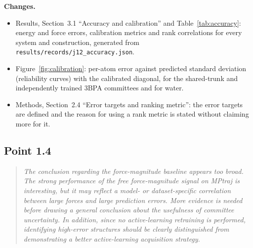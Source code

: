 \documentclass[11pt]{article}
\newcommand{\rpoint}[1]{\begin{quote}\itshape #1\end{quote}}
\newcommand{\changes}{\medskip\noindent\textbf{Changes.}}
\begin{document}
\changes
\begin{itemize}
\item Results, Section~3.1 ``Accuracy and calibration'' and
  Table~\ref{tab:accuracy}: energy and force errors, calibration metrics and
  rank correlations for every system and construction, generated from
  \texttt{results/records/j12\_accuracy.json}.
\item Figure~\ref{fig:calibration}: per-atom error against predicted standard
  deviation (reliability curves) with the calibrated diagonal, for the
  shared-trunk and independently trained 3BPA committees and for water.
\item Methods, Section~2.4 ``Error targets and ranking metric'': the error
  targets are defined and the reason for using a rank metric is stated
  without claiming more for it.
\end{itemize}

\subsection*{Point 1.4}
\rpoint{The conclusion regarding the force-magnitude baseline appears too
broad. The strong performance of the free force-magnitude signal on MPtraj is
interesting, but it may reflect a model- or dataset-specific correlation
between large forces and large prediction errors. More evidence is needed
before drawing a general conclusion about the usefulness of committee
uncertainty. In addition, since no active-learning retraining is performed,
identifying high-error structures should be clearly distinguished from
demonstrating a better active-learning acquisition strategy.}
\end{document}
